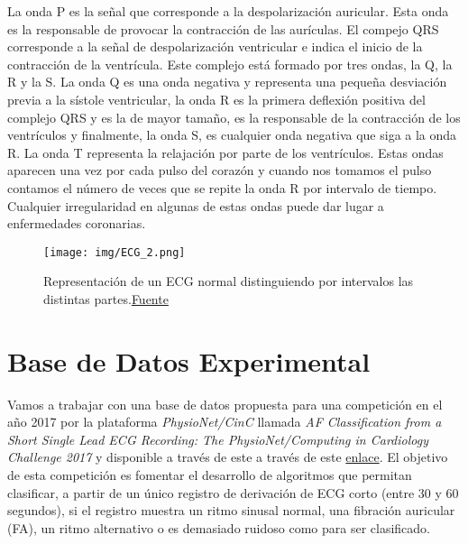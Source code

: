     La onda P es la señal que corresponde a la despolarización auricular. Esta onda es la responsable de provocar la contracción de las aurículas. El compejo QRS corresponde a la señal de despolarización ventricular e indica el inicio de la contracción de la ventrícula. Este complejo está formado por tres ondas, la Q, la R y la S. La onda Q es una onda negativa y representa una pequeña desviación previa a la sístole ventricular, la onda R es la primera deflexión positiva del complejo QRS y es la de mayor tamaño, es la responsable de la contracción de los ventrículos y finalmente, la onda S, es cualquier onda negativa que siga a la onda R. La onda T representa la relajación por parte de los ventrículos. Estas ondas aparecen una vez por cada pulso del corazón y cuando nos tomamos el pulso contamos el número de veces que se repite la onda R por intervalo de tiempo. Cualquier irregularidad en algunas de estas ondas puede dar lugar a enfermedades coronarias. \\
    
    \begin{figure}[H]
        \centering
        \texttt{[image: img/ECG\_2.png]}
        \caption{Representación de un ECG normal distinguiendo por intervalos las distintas partes.\href{https://upload.wikimedia.org/wikipedia/commons/thumb/e/e8/EKG_Complex_es.svg/1280px-EKG_Complex_es.svg.png}{Fuente}}
        \label{fig:ECG}
    \end{figure}
    
    
    
    

\section{Base de Datos Experimental}

    Vamos a trabajar con una base de datos propuesta para una competición en el año 2017 por la plataforma \textit{PhysioNet/CinC} llamada \textit{AF Classification from a Short Single Lead ECG Recording: The PhysioNet/Computing in Cardiology Challenge 2017} y disponible a través de este a través de este \href{https://physionet.org/content/challenge-2017/1.0.0/}{enlace}. El objetivo de esta competición es fomentar el desarrollo de algoritmos que permitan clasificar, a partir de un único registro de derivación de ECG corto (entre 30 y 60 segundos), si el registro muestra un ritmo sinusal normal, una fibración auricular (FA), un ritmo alternativo o es demasiado ruidoso como para ser clasificado. \\
    
